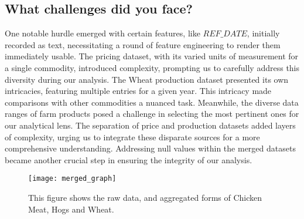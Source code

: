 \subsection{What challenges did you face?}

One notable hurdle emerged with certain features, like $REF\_DATE$, initially recorded as text, necessitating a round of feature engineering to render them immediately usable.
The pricing dataset, with its varied units of measurement for a single commodity, introduced complexity, prompting us to carefully address this diversity during our analysis.
The Wheat production dataset presented its own intricacies, featuring multiple entries for a given year.
This intricacy made comparisons with other commodities a nuanced task.
Meanwhile, the diverse data ranges of farm products posed a challenge in selecting the most pertinent ones for our analytical lens.
The separation of price and production datasets added layers of complexity, urging us to integrate these disparate sources for a more comprehensive understanding.
Addressing null values within the merged datasets became another crucial step in ensuring the integrity of our analysis.


\begin{figure}
    \texttt{[image: merged\_graph]}
    \caption{This figure shows the raw data, and aggregated forms of Chicken Meat, Hogs and Wheat.}
    \label{fig:chicken_prices}
\end{figure}

